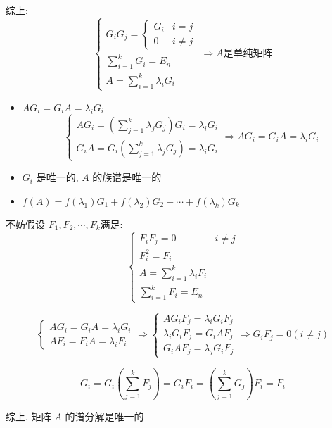 \begin{anymark}[证明]
	综上:
	$$\begin{cases}
		G_{i}G_{j} = 
			\begin{cases}
				G_{i} & i = j\\
				0 & i\neq j	
			\end{cases}\\	
		\sum\limits_{i=1}^{k}G_{i} = E_{n}\\
		A = \sum\limits_{i=1}^{k}\lambda_{i}G_{i}
	\end{cases}\Rightarrow A \text{是单纯矩阵}$$
\end{anymark}

\begin{corollary}[谱族$G_{i}$推论]
	\begin{itemize}
		\item $AG_{i} = G_{i}A = \lambda_{i}G_{i}$
		$$\begin{cases}
		  AG_{i} = \left(\sum\limits_{j = 1}^{k}\lambda_{j}G_{j}\right)G_{i} = \lambda_{i}G_{i}\\
		  G_{i}A = G_{i}\left(\sum\limits_{j = 1}^{k}\lambda_{j}G_{j}\right) = \lambda_{i}G_{i}
		\end{cases}\Rightarrow AG_{i} = G_{i}A = \lambda_{i}G_{i}$$
		\item $G_{i}$ 是唯一的, $A$ 的族谱是唯一的
		\item $f(A) = f(\lambda_{1})G_{1} + f(\lambda_{2})G_{2} + \cdots + f(\lambda_{k})G_{k}$
	\end{itemize}
\end{corollary}
\begin{theorem}[谱分解唯一性]
	不妨假设 $F_{1}, F_{2}, \cdots,F_{k}$满足:  
	$$\begin{cases}
		F_{i}F_{j} = 0  & i\neq j\\
		F_{i}^2 = F_{i} & \\
		A = \sum\limits_{i=1}^{k}\lambda_{i}F_{i} & \\
		\sum\limits_{i=1}^{k}F_{i} = E_{n}
	\end{cases}$$
	
	
	$$\begin{cases}
		AG_{i} = G_{i}A = \lambda_{i}G_{i}\\
		AF_{i} = F_{i}A = \lambda_{i}F_{i}
	\end{cases}\Rightarrow 
	\begin{cases}
		AG_{i}F_{j} = \lambda_{i}G_{i}F_{j}\\
		\lambda_{i}G_{i}F_{j} = G_{i}AF_{j}\\
		G_{i}AF_{j} = \lambda_{j}G_{i}F_{j}
	\end{cases}\Rightarrow G_{i}F_{j} = 0 (i\neq j)$$
	
	$$G_{i} = G_{i}(\sum\limits_{j = 1}^{k}F_{j}) = G_{i}F_{i}=(\sum\limits_{j=1}^{k}G_{j})F_{i}=F_{i}$$
	
	综上, 矩阵 $A$ 的谱分解是唯一的
\end{theorem}







